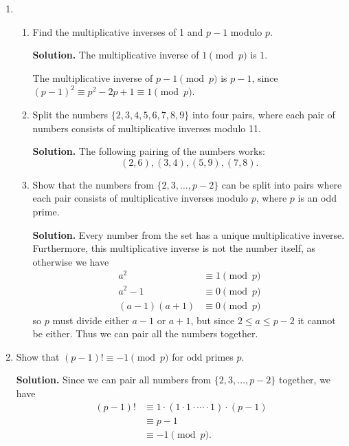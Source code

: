 \documentclass[11pt]{article}
\theoremstyle{definition}
\begin{document}
\begin{enumerate} \addtocounter{enumi}{\value{problem_count}}

\item \addtocounter{problem_count}{1}
\begin{enumerate}
\item Find the multiplicative inverses of 1 and $p - 1$ modulo $p$.

\textbf{Solution.}
The multiplicative inverse of $1 \pmod{p}$ is $1$.

The multiplicative inverse of $p - 1 \pmod{p}$ is $p - 1$, since $(p - 1)^2 \equiv p^2 - 2p + 1 \equiv 1 \pmod{p}$.

\item Split the numbers $\{ 2, 3, 4, 5, 6, 7, 8, 9\}$ into four pairs, where each pair of numbers consists of multiplicative inverses modulo 11.

\textbf{Solution.}
The following pairing of the numbers works:
\[(2, 6), (3, 4), (5, 9), (7, 8).\]

\item Show that the numbers from $\{ 2, 3, \ldots, p - 2\}$ can be split into pairs where each pair consists of multiplicative inverses modulo $p$, where $p$ is an odd prime.

\textbf{Solution.}
Every number from the set has a unique multiplicative inverse. Furthermore, this multiplicative inverse is not the number itself, as otherwise we have
\begin{align*}
a^2 &\equiv 1 \pmod{p} \\
a^2 - 1 &\equiv 0 \pmod{p} \\
(a - 1)(a + 1) &\equiv 0 \pmod{p}
\end{align*}
so $p$ must divide either $a - 1$ or $a + 1$, but since $2 \le a \le p - 2$ it cannot be either. Thus we can pair all the numbers together.

\end{enumerate}

\item \addtocounter{problem_count}{1}
Show that $(p - 1)! \equiv -1 \pmod{p}$ for odd primes $p$.

\textbf{Solution.}
Since we can pair all numbers from $\{2, 3, \ldots, p - 2\}$ together, we have
\begin{align*}
(p - 1)! &\equiv 1 \cdot (1 \cdot 1 \cdot \cdots \cdot 1) \cdot (p - 1) \\
&\equiv p - 1 \\
&\equiv -1 \pmod{p}.
\end{align*}

\end{enumerate}
\end{document}
